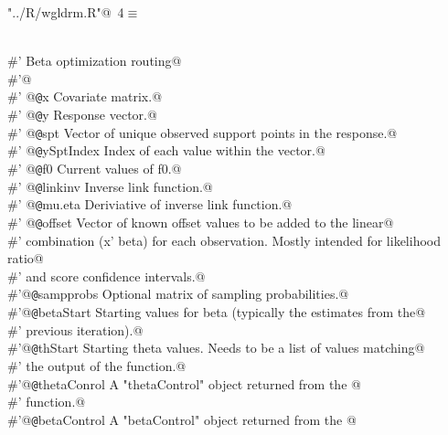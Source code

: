 \documentclass[reqno]{amsart}
\renewcommand{\NWtarget}[2]{\hypertarget{#1}{#2}}
\begin{document}
\begin{flushleft} \small\label{scrap2}\raggedright\small
\NWtarget{nuweb4}{} \verb@"../R/wgldrm.R"@\nobreak\ {\footnotesize {4}}$\equiv$
\vspace{-1ex}
\begin{list}{}{} \item
\mbox{}\verb@@\\
\mbox{}\verb@#' Beta optimization routing@\\
\mbox{}\verb@#'@\\
\mbox{}\verb@#' @{\tt @}\verb@param x Covariate matrix.@\\
\mbox{}\verb@#' @{\tt @}\verb@param y Response vector.@\\
\mbox{}\verb@#' @{\tt @}\verb@param spt Vector of unique observed support points in the response.@\\
\mbox{}\verb@#' @{\tt @}\verb@param ySptIndex Index of each  value within the  vector.@\\
\mbox{}\verb@#' @{\tt @}\verb@param f0 Current values of f0.@\\
\mbox{}\verb@#' @{\tt @}\verb@param linkinv Inverse link function.@\\
\mbox{}\verb@#' @{\tt @}\verb@param mu.eta Deriviative of inverse link function.@\\
\mbox{}\verb@#' @{\tt @}\verb@param offset Vector of known offset values to be added to the linear@\\
\mbox{}\verb@#' combination (x' beta) for each observation. Mostly intended for likelihood ratio@\\
\mbox{}\verb@#' and score confidence intervals.@\\
\mbox{}\verb@#'@{\tt @}\verb@param sampprobs Optional matrix of sampling probabilities.@\\
\mbox{}\verb@#'@{\tt @}\verb@param betaStart Starting values for beta (typically the estimates from the@\\
\mbox{}\verb@#' previous iteration).@\\
\mbox{}\verb@#'@{\tt @}\verb@param thStart Starting theta values. Needs to be a list of values matching@\\
\mbox{}\verb@#' the output of the  function.@\\
\mbox{}\verb@#'@{\tt @}\verb@param thetaConrol A "thetaControl" object returned from the @\\
\mbox{}\verb@#' function.@\\
\mbox{}\verb@#'@{\tt @}\verb@param betaControl A "betaControl" object returned from the @\\

\end{list}
\end{flushleft}
\end{document}
